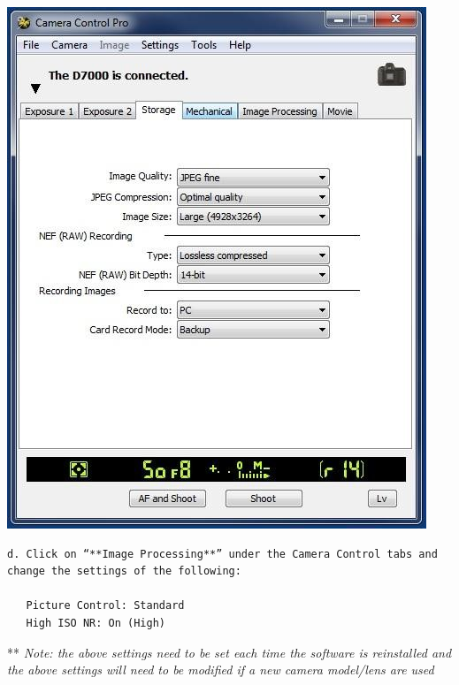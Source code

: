 \documentclass[]{book}
\begin{document}
\includegraphics{images/Camera5.jpg}

\begin{verbatim}
d. Click on “**Image Processing**” under the Camera Control tabs and change the settings of the following:  

   Picture Control: Standard  
   High ISO NR: On (High)
\end{verbatim}

** \emph{Note: the above settings need to be set each time the software is reinstalled and the above settings will need to be modified if a new camera model/lens are used}
\end{document}
